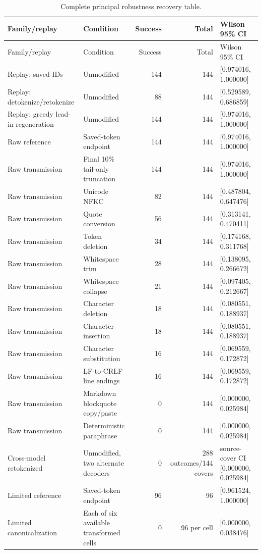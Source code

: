 \documentclass[fleqn,10pt]{wlscirep}
\begin{document}
\setlength{\tabcolsep}{3pt}
\begin{longtable}{L{0.20\textwidth}L{0.22\textwidth}r r L{0.18\textwidth}}
\caption{\label{tab:robustness}Complete principal robustness recovery table.}\\
\toprule
Family/replay & Condition & Success & Total & Wilson 95\% CI \\
\midrule
\endfirsthead
\toprule
Family/replay & Condition & Success & Total & Wilson 95\% CI \\
\midrule
\endhead
Replay: saved IDs & Unmodified & 144 & 144 & [0.974016, 1.000000] \\
Replay: detokenize/retokenize & Unmodified & 88 & 144 & [0.529589, 0.686859] \\
Replay: greedy lead-in regeneration & Unmodified & 144 & 144 & [0.974016, 1.000000] \\
Raw reference & Saved-token endpoint & 144 & 144 & [0.974016, 1.000000] \\
Raw transmission & Final 10\% tail-only truncation & 144 & 144 & [0.974016, 1.000000] \\
Raw transmission & Unicode NFKC & 82 & 144 & [0.487804, 0.647476] \\
Raw transmission & Quote conversion & 56 & 144 & [0.313141, 0.470411] \\
Raw transmission & Token deletion & 34 & 144 & [0.174168, 0.311768] \\
Raw transmission & Whitespace trim & 28 & 144 & [0.138095, 0.266672] \\
Raw transmission & Whitespace collapse & 21 & 144 & [0.097405, 0.212667] \\
Raw transmission & Character deletion & 18 & 144 & [0.080551, 0.188937] \\
Raw transmission & Character insertion & 18 & 144 & [0.080551, 0.188937] \\
Raw transmission & Character substitution & 16 & 144 & [0.069559, 0.172872] \\
Raw transmission & LF-to-CRLF line endings & 16 & 144 & [0.069559, 0.172872] \\
Raw transmission & Markdown blockquote copy/paste & 0 & 144 & [0.000000, 0.025984] \\
Raw transmission & Deterministic paraphrase & 0 & 144 & [0.000000, 0.025984] \\
Cross-model retokenized & Unmodified, two alternate decoders & 0 & 288 outcomes/144 covers & source-cover CI [0.000000, 0.025984] \\
Limited reference & Saved-token endpoint & 96 & 96 & [0.961524, 1.000000] \\
Limited canonicalization & Each of six available transformed cells & 0 & 96 per cell & [0.000000, 0.038476] \\
\bottomrule
\end{longtable}
\end{document}
